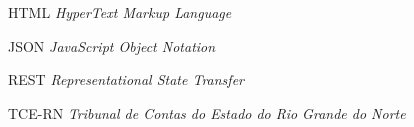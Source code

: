 \documentclass[
	12pt,				%
	oneside,
	a4paper,			%
	chapter=TITLE,
	english,			%
	brazil,				%
	]{abntex2}
\begin{document}

\frenchspacing 

\pretextual

\imprimircapa

\imprimirfolhaderosto




% 




\listoffigures*
\cleardoublepage

\listoftables*
\cleardoublepage

\begin{siglas}
\item[HTML] \textit{HyperText Markup Language}
\item[JSON] \textit{JavaScript Object Notation}
\item[REST] \textit{Representational State Transfer}
\item[TCE-RN] \textit{Tribunal de Contas do Estado do Rio Grande do Norte}
\end{siglas}
\end{document}
